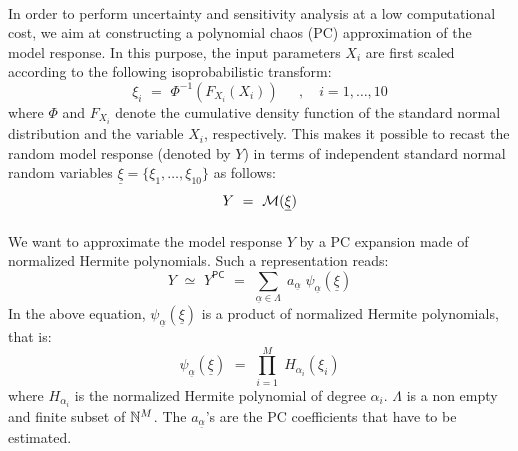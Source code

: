 \documentclass[11pt]{article}
\begin{document}
\paragraph{}
In order to perform uncertainty and sensitivity analysis at a low computational cost, we aim at constructing a polynomial chaos (PC) approximation of the model response. In this purpose, the input parameters $X_i$ are first scaled according to the following isoprobabilistic transform:
\begin{equation}
  \xi_i \, \, = \, \, \Phi^{-1}(F_{X_i}(X_i)) \, \quad \; , \quad i=1,\dots,10
\end{equation}
where $\Phi$ and $F_{X_i}$ denote the cumulative density function of the standard normal distribution and the variable $X_i$, respectively. This makes it possible to recast the random model response (denoted by $Y$) in terms of independent standard normal random variables $\underline{\xi} = \{\xi_1,\dots,\xi_{10}\}$ as follows:
\begin{equation}
  Y \, \, = \, \, {\mathcal M}(\underline{\xi})
\end{equation}

\paragraph{}
We want to approximate the model response $Y$ by a PC expansion made of normalized Hermite polynomials. Such a representation reads:
\begin{equation}
  Y \, \, \simeq \, \, Y^\textsf{PC} \, \, = \, \, \sum_{\underline{\alpha} \in \Lambda} \; a_{\underline{\alpha}} \; \psi_{\underline{\alpha}}(\underline{\xi})
\end{equation}
In the above equation, $\psi_{\underline{\alpha}}(\underline{\xi})$ is a product of normalized Hermite polynomials, that is:
\begin{equation}
  \psi_{\underline{\alpha}}(\underline{\xi}) \, \, = \, \, \prod_{i=1}^M \; H_{\alpha_i}(\xi_i)
\end{equation}
where $H_{\alpha_i}$ is the normalized Hermite polynomial of degree $\alpha_i$. $\Lambda$ is a non empty and finite subset of ${\mathbb N}^M$. The $a_{\underline{\alpha}}$'s are the PC coefficients that have to be estimated.
\end{document}
